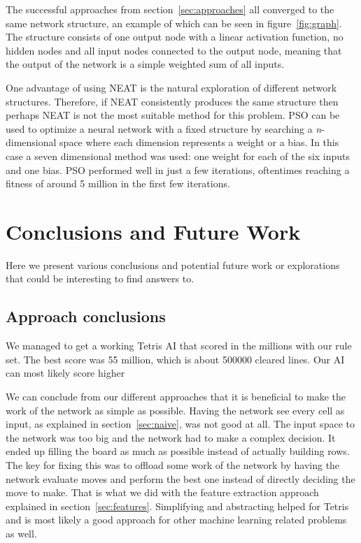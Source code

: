 \documentclass{article}
\begin{document}
The successful approaches from section~\ref{sec:approaches} all converged to the same network structure, an example of which can be seen in figure~\ref{fig:graph}. The structure consists of one output node with a linear activation function, no hidden nodes and all input nodes connected to the output node, meaning that the output of the network is a simple weighted sum of all inputs.

One advantage of using NEAT is the natural exploration of different network structures. Therefore, if NEAT consistently produces the same structure then perhaps NEAT is not the most suitable method for this problem. PSO can be used to optimize a neural network with a fixed structure by searching a \textit{n}-dimensional space where each dimension represents a weight or a bias. In this case a seven dimensional method was used: one weight for each of the six inputs and one bias. PSO performed well in just a few iterations, oftentimes reaching a fitness of around 5 million in the first few iterations.

\section{Conclusions and Future Work}

Here we present various conclusions and potential future work or explorations that could be interesting to find answers to.

\subsection{Approach conclusions}
We managed to get a working Tetris AI that scored in the millions with our rule set. The best score was 55 million, which is about 500000 cleared lines.
Our AI can most likely score higher 

We can conclude from our different approaches that it is beneficial to make the work of the network as simple as possible.
Having the network see every cell as input, as explained in section~\ref{sec:naive}, was not good at all. The input space to the network was too big and the network had to make a complex decision.
It ended up filling the board as much as possible instead of actually building rows.
The key for fixing this was to offload some work of the network by having the network evaluate moves and perform the best one instead of directly deciding the move to make.
That is what we did with the feature extraction approach explained in section~\ref{sec:features}.
Simplifying and abstracting helped for Tetris and is most likely a good approach for other machine learning related problems as well.
\end{document}
